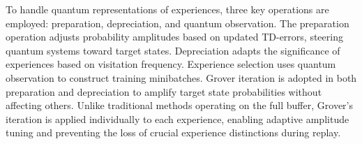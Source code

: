 \documentclass[journal]{IEEEtran}
\begin{document}

To handle quantum representations of experiences, three key operations are employed: preparation, depreciation, and quantum observation. The preparation operation adjusts probability amplitudes based on updated TD-errors, steering quantum systems toward target states. Depreciation adapts the significance of experiences based on visitation frequency. Experience selection uses quantum observation to construct training minibatches. Grover iteration is adopted in both preparation and depreciation to amplify target state probabilities without affecting others. Unlike traditional methods operating on the full buffer, Grover's iteration is applied individually to each experience, enabling adaptive amplitude tuning and preventing the loss of crucial experience distinctions during replay.
\end{document}
